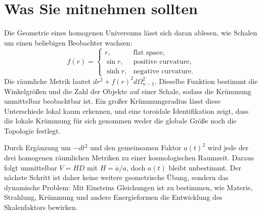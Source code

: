 \section{Was Sie mitnehmen sollten}

Die Geometrie eines homogenen Universums lässt sich daran ablesen, wie Schalen um einen beliebigen Beobachter wachsen:
\begin{equation}
f(r)=
\begin{cases}
r, & \text{flat space},\\
\sin r, & \text{positive curvature},\\
\sinh r, & \text{negative curvature}.
\end{cases}
\end{equation}
Die räumliche Metrik lautet \(dr^2+f(r)^2d\Omega_{n-1}^2\). Dieselbe Funktion bestimmt die Winkelgrößen und die Zahl der Objekte auf einer Schale, sodass die Krümmung unmittelbar beobachtbar ist. Ein großer Krümmungsradius lässt diese Unterschiede lokal kaum erkennen, und eine toroidale Identifikation zeigt, dass die lokale Krümmung für sich genommen weder die globale Größe noch die Topologie festlegt.

Durch Ergänzung um \(-dt^2\) und den gemeinsamen Faktor \(a(t)^2\) wird jede der drei homogenen räumlichen Metriken zu einer kosmologischen Raumzeit. Daraus folgt unmittelbar \(V=HD\) mit \(H=\dot a/a\), doch \(a(t)\) bleibt unbestimmt. Der nächste Schritt ist daher keine weitere geometrische Übung, sondern das dynamische Problem: Mit Einsteins Gleichungen ist zu bestimmen, wie Materie, Strahlung, Krümmung und andere Energieformen die Entwicklung des Skalenfaktors bewirken.

